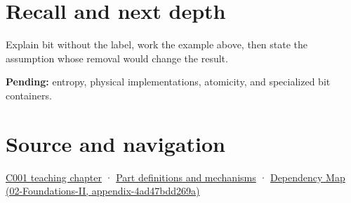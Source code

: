 \section{Recall and next depth}\label{appendix-ddbb69998a2e-recall-and-next-depth}

Explain bit without the label, work the example above, then state the assumption whose removal would change the result.

\textbf{Pending:} entropy, physical implementations, atomicity, and specialized bit containers.

\section{Source and navigation}\label{appendix-ddbb69998a2e-source-and-navigation}

\href{Continuous\%20Notes/Computing\%20Foundations\%20-\%20From\%20Bits\%20to\%20C++\%20and\%20Systems\%20APIs\#From\%20a\%20signal\%20to\%20an\%20interpretation}{C001 teaching chapter} · \hyperref[appendix-fd090d982a15]{Part definitions and mechanisms} · \href{../02-Foundations-II/main.pdf\#nameddest=appendix-4ad47bdd269a}{Dependency Map (02-Foundations-II, appendix-4ad47bdd269a)}
